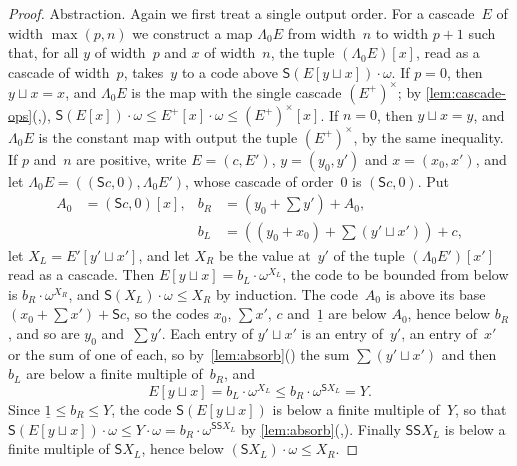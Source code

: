 \documentclass[11pt]{amsart}
\newcommand{\bS}{\mathsf{S}}
\newcommand{\bplus}{\mathbin{+}}
\newcommand{\btimes}{\mathbin{\cdot}}
\newcommand{\num}[1]{\underline{#1}}          %
\newcommand{\tsum}[1]{\textstyle\sum #1}
\newcommand{\act}[2]{#1[#2]}                  %
\theoremstyle{plain}
\theoremstyle{definition}
\begin{document}
\begin{proof}
Abstraction. Again we first treat a single output order. For a
cascade~$E$ of width $\max(p,n)$ we construct a map $\Lambda_0 E$ from
width~$n$ to width $p+1$ such that, for all $y$ of width~$p$ and $x$
of width~$n$, the tuple $\act{(\Lambda_0 E)}{x}$, read as a cascade of
width~$p$, takes~$y$ to a code above
$\bS(\act{E}{y \sqcup x}) \btimes \omega$. If $p = 0$, then
$y \sqcup x = x$, and $\Lambda_0 E$ is the map with the single
cascade $(E^{+})^{\times}$; by
\cref{lem:cascade-ops}(,),
$\bS(\act E x) \btimes \omega \le \act{E^{+}}{x} \btimes \omega \le
\act{(E^{+})^{\times}}{x}$. If $n = 0$, then $y \sqcup x = y$, and
$\Lambda_0 E$ is the constant map with output the tuple
$(E^{+})^{\times}$, by the same inequality. If $p$ and~$n$ are
positive, write $E = (c, E')$, $y = (y_0, y')$ and $x = (x_0, x')$,
and let $\Lambda_0 E = ((\bS c, 0), \Lambda_0 E')$, whose cascade of
order~$0$ is $(\bS c, 0)$. Put
\begin{align*}
  A_0 &= \act{(\bS c, 0)}{x} , &
  b_R &= (y_0 \bplus \tsum y') \bplus A_0 , \\
  & &
  b_L &= ((y_0 \bplus x_0) \bplus \tsum(y' \sqcup x')) \bplus c ,
\end{align*}
let $X_L = \act{E'}{y' \sqcup x'}$, and let $X_R$ be the value at~$y'$
of the tuple $\act{(\Lambda_0 E')}{x'}$ read as a cascade. Then
$\act{E}{y \sqcup x} = b_L \btimes \omega^{X_L}$, the code to be
bounded from below is $b_R \btimes \omega^{X_R}$, and
$\bS(X_L) \btimes \omega \le X_R$ by induction. The code~$A_0$ is
above its base $(x_0 \bplus \tsum x') \bplus \bS c$, so the codes
$x_0$, $\tsum x'$, $c$ and~$\num 1$ are below $A_0$, hence below
$b_R$, and so are $y_0$ and~$\tsum y'$. Each entry of $y' \sqcup x'$
is an entry of~$y'$, an entry of~$x'$ or the sum of one of each, so
by~\cref{lem:absorb}() the sum
$\tsum(y' \sqcup x')$ and then $b_L$ are below a finite multiple
of~$b_R$, and
\[
  \act{E}{y \sqcup x} = b_L \btimes \omega^{X_L}
  \le b_R \btimes \omega^{\bS X_L} = Y .
\]
Since $\num 1 \le b_R \le Y$, the code $\bS(\act{E}{y \sqcup x})$ is
below a finite multiple of~$Y$, so that
$\bS(\act{E}{y \sqcup x}) \btimes \omega \le Y \btimes \omega =
b_R \btimes \omega^{\bS\bS X_L}$ by
\cref{lem:absorb}(,).
Finally $\bS\bS X_L$ is below a finite multiple of $\bS X_L$, hence
below $(\bS X_L) \btimes \omega \le X_R$.


\end{proof}
\end{document}
